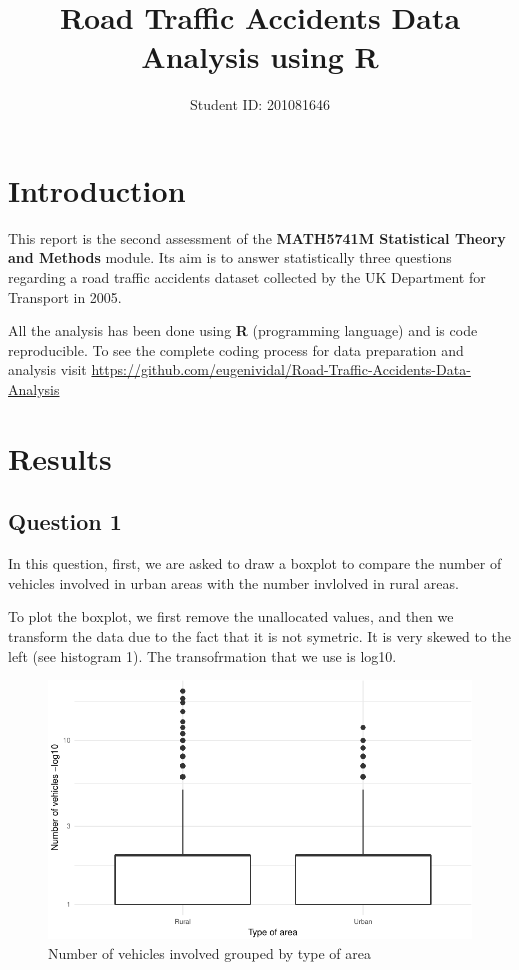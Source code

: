 \documentclass[]{article}
\title{Road Traffic Accidents Data Analysis using R}
\author{Student ID: 201081646}
\date{}
\begin{document}
\maketitle

\section{Introduction}\label{introduction}

This report is the second assessment of the \textbf{MATH5741M
Statistical Theory and Methods} module. Its aim is to answer
statistically three questions regarding a road traffic accidents dataset
collected by the UK Department for Transport in 2005.

All the analysis has been done using \textbf{R} (programming language)
and is code reproducible. To see the complete coding process for data
preparation and analysis visit
\url{https://github.com/eugenividal/Road-Traffic-Accidents-Data-Analysis}

\section{Results}\label{results}

\subsection{Question 1}\label{question-1}

In this question, first, we are asked to draw a boxplot to compare the
number of vehicles involved in urban areas with the number invlolved in
rural areas.

To plot the boxplot, we first remove the unallocated values, and then we
transform the data due to the fact that it is not symetric. It is very
skewed to the left (see histogram 1). The transofrmation that we use is
log10.

\begin{figure}[H]

{\centering \includegraphics{READMEv2_files/figure-latex/fig-1} 

}

\caption{Number of vehicles involved grouped by type of area}\label{fig:fig}
\end{figure}
\end{document}
